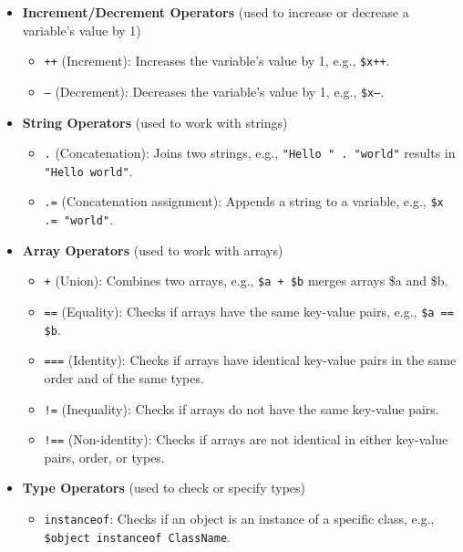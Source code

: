 \documentclass{report}
\begin{document}
\begin{itemize}
\begin{itemize}
                \item \textbf{Increment/Decrement Operators} (used to increase or decrease a variable's value by 1)
                    \begin{itemize}
                        \item \texttt{++} (Increment): Increases the variable’s value by 1, e.g., \texttt{\$x++}.
                        \item \texttt{--} (Decrement): Decreases the variable’s value by 1, e.g., \texttt{\$x--}.
                    \end{itemize}

                \item \textbf{String Operators} (used to work with strings)
                    \begin{itemize}
                        \item \texttt{.} (Concatenation): Joins two strings, e.g., \texttt{"Hello " . "world"} results in \texttt{"Hello world"}.
                        \item \texttt{.=} (Concatenation assignment): Appends a string to a variable, e.g., \texttt{\$x .= "world"}.
                    \end{itemize}

                \item \textbf{Array Operators} (used to work with arrays)
                    \begin{itemize}
                        \item \texttt{+} (Union): Combines two arrays, e.g., \texttt{\$a + \$b} merges arrays \$a and \$b.
                        \item \texttt{==} (Equality): Checks if arrays have the same key-value pairs, e.g., \texttt{\$a == \$b}.
                        \item \texttt{===} (Identity): Checks if arrays have identical key-value pairs in the same order and of the same types.
                        \item \texttt{!=} (Inequality): Checks if arrays do not have the same key-value pairs.
                        \item \texttt{!==} (Non-identity): Checks if arrays are not identical in either key-value pairs, order, or types.
                    \end{itemize}

                \item \textbf{Type Operators} (used to check or specify types)
                    \begin{itemize}
                        \item \texttt{instanceof}: Checks if an object is an instance of a specific class, e.g., \texttt{\$object instanceof ClassName}.
                    \end{itemize}


\end{itemize}
\end{itemize}
\end{document}
